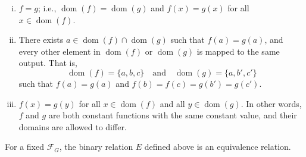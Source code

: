 \documentclass{scrartcl}
\DeclareMathOperator{\dom}{dom}
\newcommand{\SF}{\mathscr{F}}
\begin{document}
\begin{enumerate}[i)]

\item\label{D:graph equiv 1}
$f = g$; i.e., $\dom(f)=\dom(g)$ and $f(x)=g(x)$ for all $x\in\dom(f)$.

\item\label{D:graph equiv 2}
There exists $a\in \dom(f) \cap \dom(g)$ such that $f(a) = g(a)$, and every other element in $\dom(f)$ or $ \dom(g)$ is mapped to the same output. That is, \[
\dom(f)=\{a,b,c\} \quad \text{and} \quad  \dom(g)=\{a,b',c'\}
\]
such that $f(a)=g(a)$ and $f(b)=f(c)=g(b')=g(c')$.


\item\label{D:graph equiv 3}
$f(x)=g(y)$ for all $x\in\dom(f)$ and all $y\in\dom(g)$. In other words, $f$ and $g$ are both constant functions with the same constant value, and their domains are allowed to differ.

\end{enumerate}



\begin{claim}\label{C:E is equivalence relation} For a fixed $\SF_G$, the binary relation $E$ defined above is an equivalence relation.
\end{claim}
\end{document}
